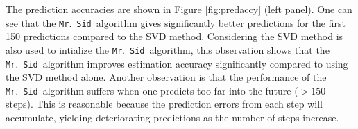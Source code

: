\documentclass[times,twocolumn,final,authoryear]{elsarticle}
\newcommand{\mrsid}{{\sc \texttt{Mr}.~\texttt{Sid}}}
\let\oldref\ref
\renewcommand{\ref}[1]{(\oldref{#1})}
\begin{document}
The prediction accuracies are shown in Figure \oldref{fig:predaccy} (left panel). One can see that the \mrsid~algorithm gives significantly better predictions for the first 150 predictions compared to the SVD method. Considering the SVD method is also used to intialize the \mrsid~algorithm, this observation shows that the \mrsid~algorithm improves estimation accuracy significantly compared to using the SVD method alone. Another observation is that the performance of the \mrsid~algorithm suffers when one predicts too far into the future ($>150$ steps). This is reasonable because the prediction errors from each step will accumulate, yielding deteriorating predictions as the number of steps increase.
\begin{figure}
\centering
{}
\end{figure}
\end{document}
